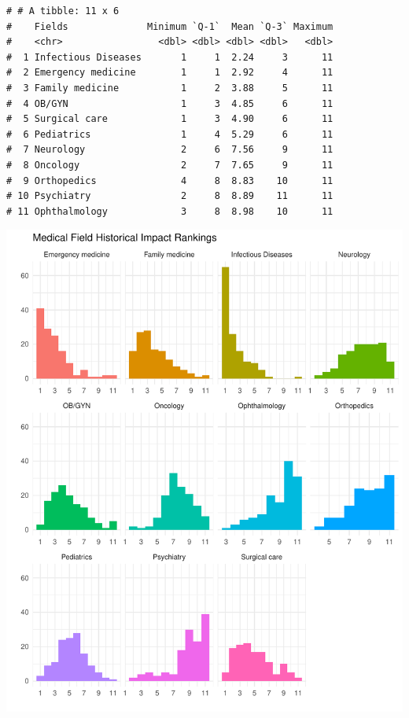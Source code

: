 \documentclass[
  letterpaper,
  DIV=11,
  numbers=noendperiod]{scrartcl}
\begin{document}
\begin{verbatim}
# # A tibble: 11 x 6
#    Fields              Minimum `Q-1`  Mean `Q-3` Maximum
#    <chr>                 <dbl> <dbl> <dbl> <dbl>   <dbl>
#  1 Infectious Diseases       1     1  2.24     3      11
#  2 Emergency medicine        1     1  2.92     4      11
#  3 Family medicine           1     2  3.88     5      11
#  4 OB/GYN                    1     3  4.85     6      11
#  5 Surgical care             1     3  4.90     6      11
#  6 Pediatrics                1     4  5.29     6      11
#  7 Neurology                 2     6  7.56     9      11
#  8 Oncology                  2     7  7.65     9      11
#  9 Orthopedics               4     8  8.83    10      11
# 10 Psychiatry                2     8  8.89    11      11
# 11 Ophthalmology             3     8  8.98    10      11
\end{verbatim}

\newpage

\includegraphics{GlobalHealthQuarto11-15_files/figure-pdf/unnamed-chunk-13-1.pdf}

\newpage
\end{document}
